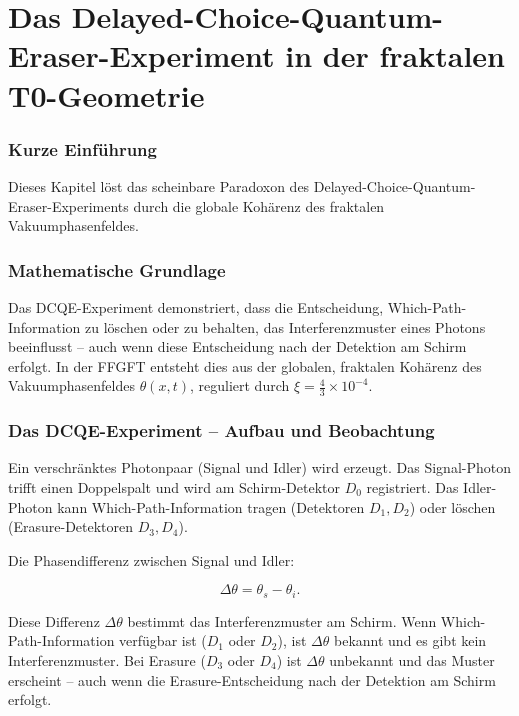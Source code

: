 \chapter{Das Delayed-Choice-Quantum-Eraser-Experiment in der fraktalen T0-Geometrie}


	
	\subsection*{Kurze Einführung}
	
	Dieses Kapitel löst das scheinbare Paradoxon des Delayed-Choice-Quantum-Eraser-Experiments durch die globale Kohärenz des fraktalen Vakuumphasenfeldes.
	
	\subsection*{Mathematische Grundlage}
	
	Das DCQE-Experiment demonstriert, dass die Entscheidung, Which-Path-Information zu löschen oder zu behalten, das Interferenzmuster eines Photons beeinflusst – auch wenn diese Entscheidung nach der Detektion am Schirm erfolgt. In der FFGFT entsteht dies aus der globalen, fraktalen Kohärenz des Vakuumphasenfeldes \(\theta(x,t)\), reguliert durch \(\xi = \frac{4}{3} \times 10^{-4}\).
	
	\subsection*{Das DCQE-Experiment – Aufbau und Beobachtung}
	
	Ein verschränktes Photonpaar (Signal und Idler) wird erzeugt. Das Signal-Photon trifft einen Doppelspalt und wird am Schirm-Detektor \(D_0\) registriert. Das Idler-Photon kann Which-Path-Information tragen (Detektoren \(D_1, D_2\)) oder löschen (Erasure-Detektoren \(D_3, D_4\)).
	
	Die Phasendifferenz zwischen Signal und Idler:
	
	\begin{equation}
		\Delta \theta = \theta_s - \theta_i.
	\end{equation}
	
	Diese Differenz \(\Delta \theta\) bestimmt das Interferenzmuster am Schirm. Wenn Which-Path-Information verfügbar ist (\(D_1\) oder \(D_2\)), ist \(\Delta \theta\) bekannt und es gibt kein Interferenzmuster. Bei Erasure (\(D_3\) oder \(D_4\)) ist \(\Delta \theta\) unbekannt und das Muster erscheint – auch wenn die Erasure-Entscheidung nach der Detektion am Schirm erfolgt.
	
